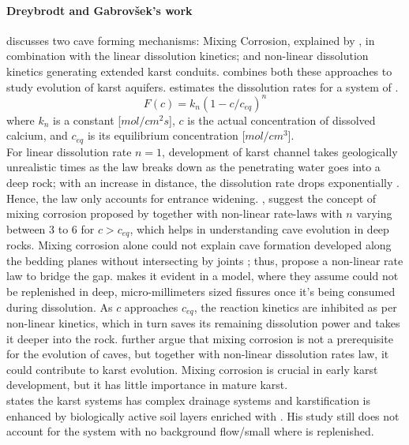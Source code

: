 \paragraph*{Dreybrodt and Gabrov{\v{s}}ek's work} \citet{gabrovvsek2000role} discusses two cave forming mechanisms: 
Mixing Corrosion, explained by \citet{bogli1980physical}, in combination with the linear dissolution kinetics; 
and non-linear dissolution kinetics generating extended karst conduits. \citet{gabrovvsek2000role} combines both 
these approaches to study evolution of karst aquifers. \citet{Dreybrodt1996} estimates the dissolution rates for 
a system of .
\[
F(c) = k_n(1-c/c_{eq})^n
\]
where $k_n$ is a constant [$mol/cm^2s$], $c$ is the actual concentration of dissolved calcium, and $c_{eq}$ is its 
equilibrium concentration [$mol/cm^3$].\\
For linear dissolution rate $n = 1$, development of karst channel takes geologically unrealistic times as the law 
breaks down as the penetrating water goes into a deep rock; with an increase in distance, the dissolution rate drops 
exponentially \cite{Dreybrodt1996}. Hence, the law only accounts for entrance widening. 
\citet{dreybrodt2004dissolution}, \citet{gabrovvsek2000role} suggest the concept of mixing corrosion 
proposed by \citet{bogli1980physical} together with non-linear rate-laws with $n$ varying between 3 to 6 for $c > c_{eq}$, 
which helps in understanding cave evolution in deep rocks. Mixing corrosion alone could not explain cave formation developed 
along the bedding planes without intersecting by joints \cite{ford1978development}; thus, \citet{gabrovvsek2000role} propose 
a non-linear rate law to bridge the gap. \citet{gabrovvsek2000role} makes it evident in a model, where they assume  
could not be replenished in deep, micro-millimeters sized fissures once it's being consumed during dissolution. As $c$ 
approaches $c_{eq}$, the reaction kinetics are inhibited as per non-linear kinetics, which in turn saves its remaining 
dissolution power and takes it deeper into the rock. \citet{gabrovvsek2000role} further argue that mixing corrosion is not 
a prerequisite for the evolution of caves, but together with non-linear dissolution rates law, it could contribute to karst 
evolution. Mixing corrosion \cite{bogli1980physical} is crucial in early karst development, but it has little importance in 
mature karst. \\



\citet{bonacci2001analysis} states the karst systems has complex drainage systems and karstification is enhanced by biologically 
active soil layers enriched with . His study still does not account for the system with no background flow/small 
where  is replenished. \\

